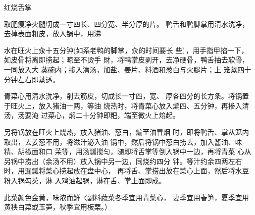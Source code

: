 \begin{recipe}{红烧舌掌}

\ingredients


\cooking

\step 取肥痩净火腿切成一寸四长、四分宽、半分厚的片。 鸭舌和鸭脚掌用清水洗净，去掉表面粗皮，放入锅中，用沸

水在旺火上汆十五分钟(如系老鸭的脚掌，汆的时间要长 些〕，用手指甲掐一下，如皮骨将离即捞起；晾至不烫手 財，将鸭掌皮剥开，去净硬骨，鸭舌抽去软骨，一同放入大 蒸碗内；掺入清汤，加盐、姜片、料酒和葱白与火腿片；上 笼蒸四十分钟左右即蒸透。

\step 青菜心用清水洗净，削去筋皮，切成长一寸四，宽、 厚各四分的长方条。将锅置于旺火上，放入猪油一两，等油 烧热时，将青菜心放入煸四、五分钟，再掺入清汤，汤要淹 过菜心，焖二十分钟即粑，端至微火上焙起。

另将锅放在旺火上烧热，放入猪油、葱白，煸至油冒烟 时，即将鸭舌、掌从笼内取出，去姜葱不用，将滋汁泌入油 锅中，然后将锅中葱白捞去，加入酱油、味精、胡椒面和口 茉等，用汤瓢搅匀，随即将舌掌等倒入锅中一边，再将青菜 心从另锅中捞出（余汤不用）放入锅中另一边，同烧约四分 钟。等汁约余四两左右时，用漏瓢将菜心捞起放在盘中心， 再将舌、掌捞出放在菜心上面，然后将水豆粉入锅勾芡，淋 入鸡油起锅，淋在舌、掌上面即成。

\notes

此菜颜色金黄，味浓而鲜〈副料蔬菜冬季宜用青菜心， 妻季宜用春笋，夏季宜用黄秧白菜或玉笋，秋季宜用板栗。）

\end{recipe}

